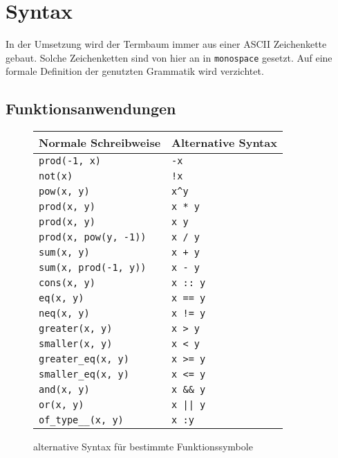 \section{Syntax} \label{subsecSyntax}
In der Umsetzung wird der Termbaum immer aus einer ASCII Zeichenkette gebaut.
Solche Zeichenketten sind von hier an in \texttt{monospace} gesetzt. Auf eine formale Definition der genutzten Grammatik wird verzichtet.

\subsection{Funktionsanwendungen}
\begin{figure}
    \label{tabZucker}
    \centering
    \begin{tabular}{l l}
        \hline
        Normale Schreibweise & Alternative Syntax\\
        \hline \hline
        \verb|prod(-1, x)|         & \verb|-x|\\
        \verb|not(x)|              & \verb|!x|\\
        \verb|pow(x, y)|           & \verb|x^y|\\
        \verb|prod(x, y)|          & \verb|x * y|\\
        \verb|prod(x, y)|          & \verb|x y|\\
        \verb|prod(x, pow(y, -1))| & \verb|x / y|\\
        \verb|sum(x, y)|           & \verb|x + y|\\
        \verb|sum(x, prod(-1, y))| & \verb|x - y|\\
        \verb|cons(x, y)|          & \verb|x :: y|\\
        \verb|eq(x, y)|            & \verb|x == y|\\
        \verb|neq(x, y)|           & \verb|x != y|\\
        \verb|greater(x, y)|       & \verb|x > y|\\
        \verb|smaller(x, y)|       & \verb|x < y|\\
        \verb|greater_eq(x, y)|    & \verb|x >= y|\\
        \verb|smaller_eq(x, y)|    & \verb|x <= y|\\
        \verb|and(x, y)|           & \verb|x && y|\\
        \verb|or(x, y)|            & \verb!x || y!\\
        \verb|of_type__(x, y)|     & \verb|x :y|\\
        \hline
    \end{tabular}
    \caption{alternative Syntax für bestimmte Funktionssymbole}
\end{figure}

